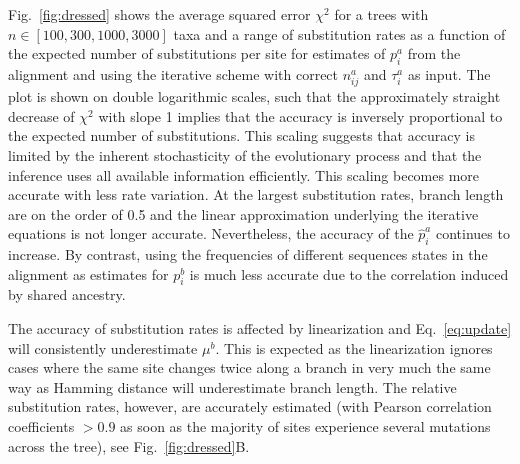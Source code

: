 \documentclass[aps,rmp,twocolumn]{revtex4}
\newcommand{\eqp}{p}
\begin{document}
Fig.~\ref{fig:dressed} shows the average squared error $\chi^2$ for a trees with $n\in [100,300,1000,3000]$ taxa and a range of substitution rates as a function of the expected number of substitutions per site for estimates of $\eqp_i^a$ from the alignment and using the iterative scheme with correct $n_{ij}^a$ and $\tau_i^a$ as input.
The plot is shown on double logarithmic scales, such that the approximately straight decrease of $\chi^2$ with slope 1 implies that the accuracy is inversely proportional to the expected number of substitutions.
This scaling suggests that accuracy is limited by the inherent stochasticity of the evolutionary process and that the inference uses all available information efficiently.
This scaling becomes more accurate with less rate variation.
At the largest substitution rates, branch length are on the order of 0.5 and the linear approximation underlying the iterative equations is not longer accurate.
Nevertheless, the accuracy of the $\hat{\eqp}_i^a$ continues to increase.
By contrast, using the frequencies of different sequences states in the alignment as estimates for $\eqp_i^b$ is much less accurate due to the correlation induced by shared ancestry.

The accuracy of substitution rates is affected by linearization and Eq.~\ref{eq:update} will consistently underestimate $\mu^b$.
This is expected as the linearization ignores cases where the same site changes twice along a branch in very much the same way as Hamming distance will underestimate branch length.
The relative substitution rates, however, are accurately estimated (with Pearson correlation coefficients $>0.9$ as soon as the majority of sites experience several mutations across the tree), see Fig.~\ref{fig:dressed}B.
\end{document}
